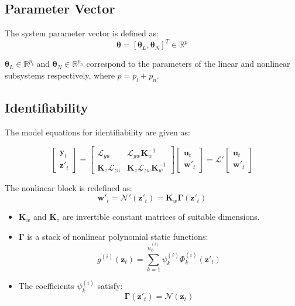 \subsection{Parameter Vector}

The system parameter vector is defined as:
\[
\boldsymbol{\theta} = [\boldsymbol{\theta}_L, \boldsymbol{\theta}_N]^T \in \mathbb{R}^p
\]

 $\boldsymbol{\theta}_L \in \mathbb{R}^{p_l}$ and $\boldsymbol{\theta}_N \in \mathbb{R}^{p_n}$ correspond to the parameters of the linear and nonlinear subsystems respectively, where $p = p_l + p_n$.


\subsection{Identifiability}

The model equations for identifiability are given as:

\[
\begin{bmatrix}
\mathbf{y}_t \\
\mathbf{z}'_t
\end{bmatrix}
=
\begin{bmatrix}
\mathcal{L}_{yu} & \mathcal{L}_{yw}\mathbf{K}_w^{-1} \\
\mathbf{K}_z\mathcal{L}_{zu} & \mathbf{K}_z\mathcal{L}_{zw}\mathbf{K}_w^{-1}
\end{bmatrix}
\begin{bmatrix}
\mathbf{u}_t \\
\mathbf{w}'_t
\end{bmatrix}
=
\mathcal{L}'
\begin{bmatrix}
\mathbf{u}_t \\
\mathbf{w}'_t
\end{bmatrix}
\]

The nonlinear block is redefined as:
\[
\mathbf{w}'_t = \mathcal{N}'(\mathbf{z}'_t) = \mathbf{K}_w\mathbf{\Gamma}(\mathbf{z}'_t)
\]

\begin{itemize}
    \item $\mathbf{K}_w$ and $\mathbf{K}_z$ are invertible constant matrices of suitable dimensions.
    \item $\mathbf{\Gamma}$ is a stack of nonlinear polynomial static functions:
    \[
    g^{(i)}(\mathbf{z}_t) = \sum_{k=1}^{n_\phi^{(i)}} \psi_k^{(i)} \Phi_k^{(i)}(\mathbf{z}'_t)
    \]
    \item The coefficients $\psi_k^{(i)}$ satisfy:
    \[
    \mathbf{\Gamma}(\mathbf{z}'_t) = \mathcal{N}(\mathbf{z}_t)
    \]
\end{itemize}

